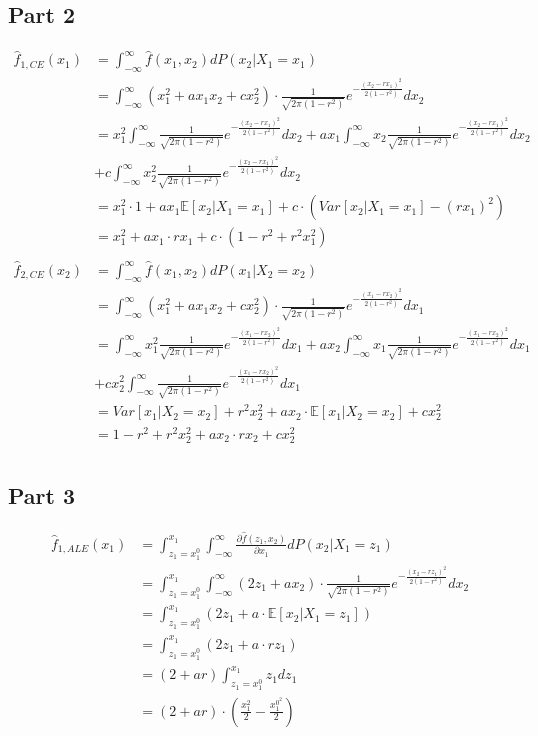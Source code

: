 \documentclass{article}
\begin{document}
\subsection{Part 2}
\begin{align*}
    \hat{f}_{1,CE}(x_1) &= \int_{-\infty}^{\infty}\hat{f}(x_1,x_2)dP(x_2|X_1 = x_1) \\
    &= \int_{-\infty}^{\infty}(x_1^2 + ax_1x_2 + cx_2^2) \cdot \frac{1}{\sqrt{2\pi(1-r^2)}}e^{-\frac{(x_2 - rx_1)^2}{2(1-r^2)}}dx_2 \\
    &= x_1^2\int_{-\infty}^{\infty}\frac{1}{\sqrt{2\pi(1-r^2)}}e^{-\frac{(x_2 - rx_1)^2}{2(1-r^2)}}dx_2 + ax_1\int_{-\infty}^{\infty}x_2\frac{1}{\sqrt{2\pi(1-r^2)}}e^{-\frac{(x_2 - rx_1)^2}{2(1-r^2)}}dx_2 \\
    &+ c\int_{-\infty}^{\infty}x_2^2\frac{1}{\sqrt{2\pi(1-r^2)}}e^{-\frac{(x_2 - rx_1)^2}{2(1-r^2)}}dx_2 \\
    &= x_1^2 \cdot 1 + ax_1\mathbb{E}[x_2|X_1 = x_1] + c \cdot (Var[x_2|X_1 = x_1] - (rx_1)^2) \\
    &= x_1^2 + ax_1\cdot rx_1 + c\cdot (1-r^2 + r^2x_1^2) \\
\end{align*}
\begin{align*}
    \hat{f}_{2,CE}(x_2) &= \int_{-\infty}^{\infty}\hat{f}(x_1,x_2)dP(x_1|X_2 = x_2) \\
    &= \int_{-\infty}^{\infty}(x_1^2 + ax_1x_2 + cx_2^2) \cdot \frac{1}{\sqrt{2\pi(1-r^2)}}e^{-\frac{(x_1 - rx_2)^2}{2(1-r^2)}}dx_1 \\
    &= \int_{-\infty}^{\infty}x_1^2\frac{1}{\sqrt{2\pi(1-r^2)}}e^{-\frac{(x_1 - rx_2)^2}{2(1-r^2)}}dx_1 + ax_2\int_{-\infty}^{\infty}x_1\frac{1}{\sqrt{2\pi(1-r^2)}}e^{-\frac{(x_1 - rx_2)^2}{2(1-r^2)}}dx_1 \\
    &+ cx_2^2\int_{-\infty}^{\infty}\frac{1}{\sqrt{2\pi(1-r^2)}}e^{-\frac{(x_1 - rx_2)^2}{2(1-r^2)}}dx_1 \\
    &= Var[x_1|X_2 = x_2] + r^2x_2^2 + ax_2\cdot \mathbb{E}[x_1|X_2 = x_2] + cx_2^2 \\
    &= 1-r^2 + r^2x_2^2 + ax_2\cdot rx_2 + cx_2^2 \\
\end{align*}

\subsection{Part 3}
\begin{align*}
    \hat{f}_{1,ALE}(x_1) &= \int_{z_1 = x_1^0}^{x_1}\int_{-\infty}^{\infty}\frac{\partial\hat{f}(z_1,x_2)}{\partial x_1}dP(x_2|X_1=z_1) \\
    &= \int_{z_1 = x_1^0}^{x_1}\int_{-\infty}^{\infty}(2z_1 + ax_2) \cdot \frac{1}{\sqrt{2\pi(1-r^2)}}e^{-\frac{(x_2 - rz_1)^2}{2(1-r^2)}}dx_2 \\
    &= \int_{z_1 = x_1^0}^{x_1}(2z_1 + a \cdot \mathbb{E}[x_2 | X_1 = z_1]) \\ 
    &= \int_{z_1 = x_1^0}^{x_1}(2z_1 + a \cdot rz_1) \\
    &= (2 + ar)\int_{z_1 = x_1^0}^{x_1}z_1 dz_1 \\
    &= (2 + ar) \cdot (\frac{x_1^2}{2} - \frac{x_1^{0^2}}{2}) \\
\end{align*}
\end{document}
